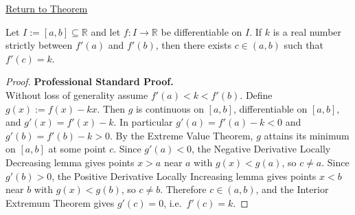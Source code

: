 \newpage
{}
\label{prf:darboux}

\begin{remark*}[Return]
\hyperref[thm:darboux]{Return to Theorem}
\end{remark*}

\begin{theorem*}
Let $I := [a,b] \subseteq \mathbb{R}$ and let $f : I \to \mathbb{R}$ be differentiable on $I$. If $k$ is a real number strictly between $f'(a)$ and $f'(b)$, then there exists $c \in (a,b)$ such that $f'(c) = k$.
\end{theorem*}

\begin{proof}
\textbf{Professional Standard Proof.}~\\
Without loss of generality assume $f'(a) < k < f'(b)$. Define $g(x) := f(x) - kx$. Then $g$ is continuous on $[a,b]$, differentiable on $[a,b]$, and $g'(x) = f'(x) - k$. In particular $g'(a) = f'(a) - k < 0$ and $g'(b) = f'(b) - k > 0$. By the Extreme Value Theorem, $g$ attains its minimum on $[a,b]$ at some point $c$. Since $g'(a) < 0$, the Negative Derivative Locally Decreasing lemma gives points $x > a$ near $a$ with $g(x) < g(a)$, so $c \neq a$. Since $g'(b) > 0$, the Positive Derivative Locally Increasing lemma gives points $x < b$ near $b$ with $g(x) < g(b)$, so $c \neq b$. Therefore $c \in (a,b)$, and the Interior Extremum Theorem gives $g'(c) = 0$, i.e.\ $f'(c) = k$.
\end{proof}

